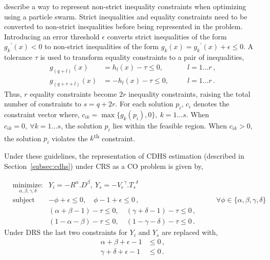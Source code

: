 \documentclass[10pt]{article}
\newcommand{\tsup}{\textsuperscript}
\begin{document}
\textcite{Cop} describe a way to represent non-strict inequality constraints when optimizing using a particle swarm.
Strict inequalities and equality constraints need to be converted to non-strict inequalities before being represented in
the problem. Introducing an error threshold $\epsilon$ converts strict inequalities of the form ${g_k}^{\prime}(x) < 0$
to non-strict inequalities of the form $g_k(x) = {g_k}^{\prime}(x) + \epsilon \leq 0$. A tolerance $\tau$ is used to
transform equality constraints to a pair of inequalities,
\begin{equation*}
  \begin{aligned}
    g_{(q+l)}(x) &= h_l(x) - \tau \leq 0,&&\quad l = 1\dots r\,,\\
    g_{(q+r+l)}(x) &= {-}h_l(x) - \tau \leq 0,&&\quad l = 1\dots r\,.
  \end{aligned}
\end{equation*}
Thus, $r$ equality constraints become $2r$ inequality constraints, raising the total number of constraints to $s = q +
2r$. For each solution $p_i$, $c_i$ denotes the constraint vector where, $c_{ik} = \max\{g_k(p_i), 0\},~k=1\dots s$.
When $c_{ik} = 0,~\forall k=1\dots s$, the solution $p_i$ lies within the feasible region. When $c_{ik} > 0$, the
solution $p_i$ violates the $k$\tsup{th} constraint.

Under these guidelines, the representation of CDHS estimation (described in Section~\ref{subsec:cdhs}) under CRS as a
CO problem is given by,

\begin{equation}\label{eq:cdhscrs}
  \begin{aligned}
    & \underset{\alpha,\beta,\gamma,\delta}{\text{minimize:}}
    & Y_i = {-}R^\alpha.D^\beta,\ Y_s = {-}{V_e}^\gamma.{T_s}^\delta\\
    & \text{subject to:}
    &  {-}\phi + \epsilon \leq 0,\quad\phi - 1 + \epsilon \leq 0\,, &\quad\quad \forall \phi\in\{\alpha,\beta,\gamma,\delta\}\\
    && (\alpha+\beta-1) - \tau \leq 0,\quad(\gamma+\delta-1) - \tau \leq 0\,,\\
    && (1-\alpha-\beta) - \tau \leq 0,\quad(1-\gamma-\delta) - \tau \leq 0\,.
  \end{aligned}
\end{equation}
Under DRS the last two constraints for $Y_i$ and $Y_s$ are replaced with,
\begin{equation}\label{eq:cdhsdrs}
  \begin{aligned}
    \alpha + \beta + \epsilon - 1 &\leq 0\,,\\
    \gamma + \delta + \epsilon - 1 &\leq 0\,.
  \end{aligned}
\end{equation}
\end{document}
